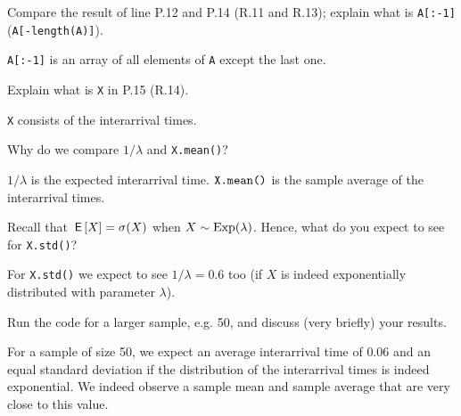\begin{exercise}
Compare the result of  line P.12 and P.14 (R.11 and R.13);  explain what is \texttt{A[:-1]} (\texttt{A[-length(A)]}).
\begin{solution}
\verb|A[:-1]| is an array of all elements of \verb|A| except the last one.
\end{solution}
\end{exercise}

\begin{exercise}
 Explain what is \texttt{X} in P.15 (R.14).
\begin{solution}
\verb|X| consists of the interarrival times.
\end{solution}
\end{exercise}

\begin{exercise}
Why do we compare $1/\lambda$ and \texttt{X.mean()}?
\begin{solution}
$1/\lambda$ is the expected interarrival time. $\verb|X.mean()|$ is the sample average of the interarrival times.
\end{solution}
\end{exercise}

\begin{exercise}
Recall that $\,\mathsf{E}\left[X\right] = \sigma (X)$ when $X\sim \mathrm{Exp}(\lambda)$.
Hence, what do you expect to see for \texttt{X.std()}?
\begin{solution}
For \verb|X.std()| we expect to see $1/\lambda = 0.6$ too (if $X$ is indeed exponentially distributed with parameter $\lambda$).
\end{solution}
\end{exercise}

\begin{exercise}
 Run the code for a larger sample, e.g. 50, and discuss (very briefly) your results.
\begin{solution}
For a sample of size 50, we expect an average interarrival time of $0.06$ and an equal standard deviation if the distribution of the interarrival times is indeed exponential. We indeed observe a sample mean and sample average that are very close to this value.
\end{solution}
\end{exercise}


